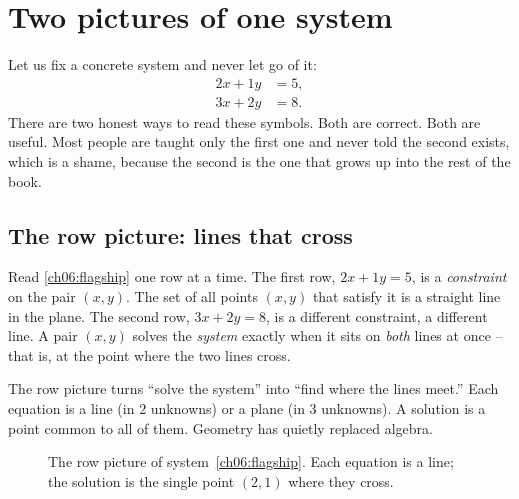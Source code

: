 \section{Two pictures of one system}

Let us fix a concrete system and never let go of it:
\begin{equation}
  \label{ch06:flagship}
  \begin{aligned}
    2x + 1y &= 5,\\
    3x + 2y &= 8.
  \end{aligned}
\end{equation}
There are two honest ways to read these symbols. Both are correct. Both are
useful. Most people are taught only the first one and never told the second
exists, which is a shame, because the second is the one that grows up into
the rest of the book.

\subsection{The row picture: lines that cross}

Read \eqref{ch06:flagship} one row at a time. The first row, $2x+1y=5$, is a
\emph{constraint} on the pair $(x,y)$. The set of all points $(x,y)$ that
satisfy it is a straight line in the plane. The second row, $3x+2y=8$, is a
different constraint, a different line. A pair $(x,y)$ solves the
\emph{system} exactly when it sits on \emph{both} lines at once -- that is,
at the point where the two lines cross.

\begin{intuitionbox}
The row picture turns ``solve the system'' into ``find where the lines
meet.'' Each equation is a line (in $2$ unknowns) or a plane (in $3$
unknowns). A solution is a point common to all of them. Geometry has quietly
replaced algebra.
\end{intuitionbox}

\begin{figure}[H]
\centering
{}
\caption{The row picture of system~\eqref{ch06:flagship}. Each equation is a
line; the solution is the single point $(2,1)$ where they cross.}
\label{ch06:rowpic}
\end{figure}

